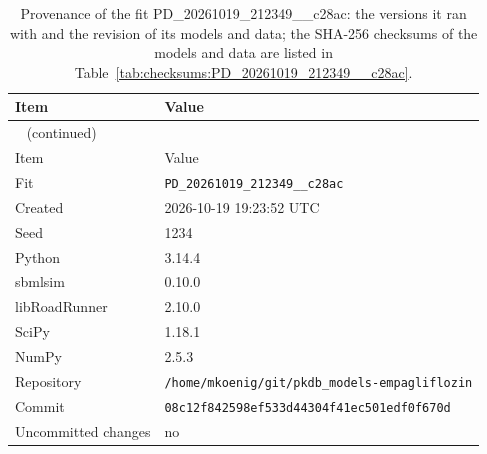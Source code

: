 \begin{longtable}{ll}
\caption{Provenance of the fit PD\_20261019\_212349\_\_c28ac: the versions it ran with and the revision of its models and data; the SHA-256 checksums of the models and data are listed in Table~\ref{tab:checksums:PD_20261019_212349__c28ac}.}\label{tab:provenance:PD_20261019_212349__c28ac} \\
\toprule
Item & Value \\
\midrule
\endfirsthead
\multicolumn{2}{l}{\small\tablename~\thetable{} (continued)} \\
\toprule
Item & Value \\
\midrule
\endhead
\bottomrule
\endlastfoot
Fit & \texttt{PD\_20261019\_212349\_\_c28ac} \\
Created & 2026-10-19 19:23:52 UTC \\
Seed & 1234 \\
Python & 3.14.4 \\
sbmlsim & 0.10.0 \\
libRoadRunner & 2.10.0 \\
SciPy & 1.18.1 \\
NumPy & 2.5.3 \\
Repository & \texttt{/home/mkoenig/git/pkdb\_models-empagliflozin} \\
Commit & \texttt{08c12f842598ef533d44304f41ec501edf0f670d} \\
Uncommitted changes & no \\
\end{longtable}




